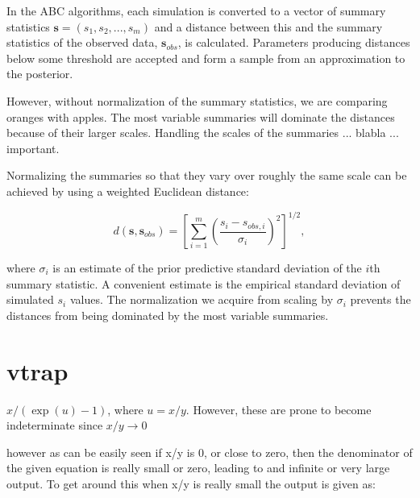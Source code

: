     
In the ABC algorithms, each simulation is converted to a vector of summary statistics $\mathbf{s} = (s_1, s_2, ..., s_m)$ and a distance between this and the summary statistics of the observed data, $\mathbf{s}_{obs}$, is calculated. Parameters producing distances below some threshold are accepted and form a sample from an approximation to the posterior. 

However, without normalization of the summary statistics, we are comparing oranges with apples. The most variable summaries will dominate the distances because of their larger scales. Handling the scales of the summaries ... blabla ... important.  

Normalizing the summaries so that they vary over roughly the same scale can be achieved by using a weighted Euclidean distance: 

$$ d \left(\mathbf{s}, \mathbf{s}_{obs} \right) = \left[ \sum_{i=1}^m \left( \frac{s_i - s_{obs, i}}{\sigma_i} \right)^2 \right]^{1/2},$$

where $\sigma_i$ is an estimate of the prior predictive standard deviation of the $i$th summary statistic. A convenient estimate is the empirical standard deviation of simulated $s_i$ values. The normalization we acquire from scaling by $\sigma_i$ prevents the distances from being dominated by the most variable summaries.  

\section{vtrap}

$x / (\exp(u) - 1)$, where $u=x/y$. However, these are prone to become indeterminate since $x/y \to 0$


however as can be easily seen if x/y is 0, or close to zero, then the denominator of the given equation is really small or zero, leading to and infinite or very large output. To get around this when x/y is really small the output is given as:








